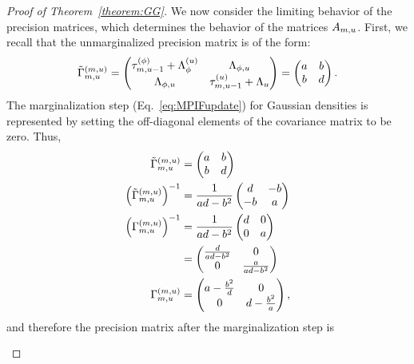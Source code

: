 \begin{proof}[Proof of Theorem~\ref{theorem:GG}]
We now consider the limiting behavior of the precision matrices, which determines the behavior of the matrices $A_{m, u}$. 
First, we recall that the unmarginalized precision matrix is of the form:
\begin{align*}
  {\tilde{\Gamma}}^{(m, u)}_{m, u} = \begin{pmatrix}
  \tau^{(\phi)}_{m, u-1} + \Lambda^{(u)}_{\phi} & \Lambda_{\phi, u} \\ 
  \Lambda_{\phi, u} & \tau^{(u)}_{m, u-1} + \Lambda_{u}\end{pmatrix} = \begin{pmatrix} 
  a & b \\ b & d
\end{pmatrix}. 
\end{align*}
The marginalization step (Eq.~\ref{eq:MPIFupdate}) for Gaussian densities is represented by setting the off-diagonal elements of the covariance matrix to be zero. 
Thus, 
\begin{align*}
    {\tilde{\Gamma}}^{(m, u)}_{m, u} &= \begin{pmatrix}a & b \\ b & d \end{pmatrix} \\
    \left({\tilde{\Gamma}}^{(m, u)}_{m, u}\right)^{-1} &= \frac{1}{ad - b^2}\begin{pmatrix}d & -b \\ -b & a\end{pmatrix} \\
    \left(\Gamma^{(m, u)}_{m, u}\right)^{-1} &= \frac{1}{ad - b^2}\begin{pmatrix}d & 0 \\ 0 & a\end{pmatrix}\\
    &= \begin{pmatrix} \frac{d}{ad-b^2} & 0 \\ 0 & \frac{a}{ad-b^2}\end{pmatrix}\\
   \Gamma^{(m, u)}_{m, u} &= \begin{pmatrix} a - \frac{b^2}{d} & 0 \\ 0 & d-\frac{b^2}{a}\end{pmatrix}, 
\end{align*}
and therefore the precision matrix after the marginalization step is 
\begin{align}
\begin{split}

\end{split}
\end{align}
\end{proof}
